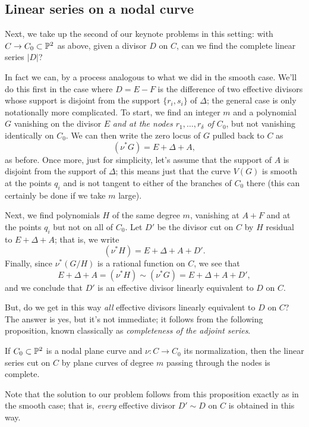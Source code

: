 \subsection{Linear series on a nodal curve}

Next, we take up the second of our keynote problems in this setting: with $C \to C_0 \subset {\mathbb P}^2$ as above, given a divisor $D$ on $C$, can we find the complete linear series $|D|$?

In fact we can, by a process analogous to what we did in the smooth case. We'll do this first in the case where $D = E-F$ is the difference of two effective divisors whose support is disjoint from the support $\{r_i, s_i\}$ of $\Delta$; the general case is only notationally more complicated. To start, we find an integer $m$ and a polynomial $G$ vanishing on the divisor $E$ \emph{and at the nodes $r_1,\dots,r_\delta$ of $C_0$}, but not vanishing identically on $C_0$. We can then write the zero locus of $G$ pulled back to $C$ as
$$
(\nu^*G) = E + \Delta + A,
$$
as before. Once more, just for simplicity, let's assume that the support of $A$ is disjoint from the support of $\Delta$; this means just that the curve $V(G)$ is smooth at the points $q_i$ and is not tangent to either of the branches of $C_0$ there (this can certainly be done if we take $m$ large).

Next, we find polynomials $H$ of the same degree $m$, vanishing at $A+F$ and at the points $q_i$ but not on all of $C_0$. Let $D'$ be the divisor cut on $C$ by $H$ residual to $E + \Delta + A$; that is, we write
$$
(\nu^*H) = E + \Delta + A + D'.
$$
Finally, since $\nu^*(G/H)$ is a rational function on $C$, we see that 
$$
E + \Delta + A = (\nu^*H) \sim (\nu^*G) = E + \Delta + A + D',
$$
and we conclude that $D'$ is an effective divisor linearly equivalent to $D$ on $C$.

But, do we get in this way \emph{all} effective divisors linearly equivalent to $D$ on $C$? The answer is yes, but it's not immediate; it follows from the following proposition, known classically as \emph{completeness of the adjoint series}.

\begin{proposition}\label{adjoint completeness}
If $C_0 \subset {\mathbb P}^2$ is a nodal plane curve and $\nu : C \to C_0$ its normalization, then the linear series cut on $C$ by plane curves of degree $m$ passing through the nodes is complete.
\end{proposition}

Note  that the solution to our problem follows from this proposition exactly as in the smooth case; that is, \emph{every} effective divisor $D' \sim D$ on $C$ is obtained in this way.

